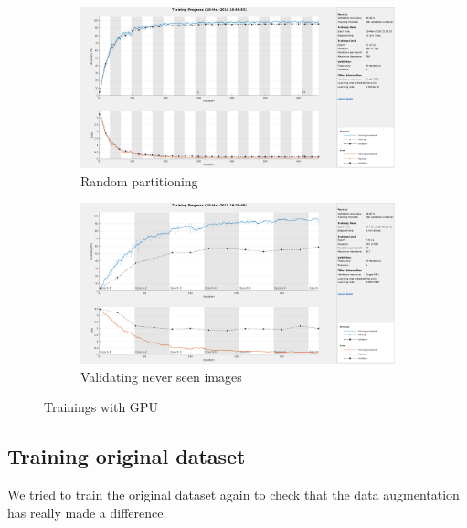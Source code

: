 \documentclass[]{article}
\begin{document}
\begin{figure}[h]
	\centering
	\begin{subfigure}[b]{0.49\textwidth}
		\includegraphics[width=\textwidth]{gpu_alldataset_partitioned.png}
		\caption{Random partitioning}
	\end{subfigure}
	\begin{subfigure}[b]{0.5\textwidth}
		\includegraphics[width=\textwidth]{gpu_ric_y_esposa_validation.png}
		\caption{Validating never seen images}
	\end{subfigure}
	
	\caption{Trainings with GPU}
\end{figure}

\subsection{Training original dataset}
We tried to train the original dataset again to check that the data augmentation has really made a difference.
\end{document}
